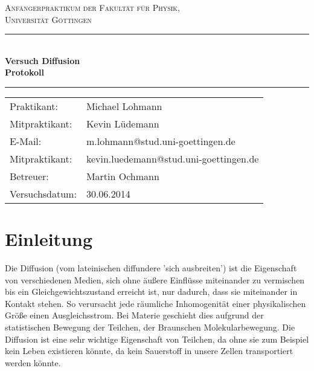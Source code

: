 \documentclass[12pt,a4paper,titlepage,headinclude,bibtotoc]{scrartcl}
\begin{document}
\begin{titlepage}
\centering
\textsc{\Large Anfängerpraktikum der Fakultät für
  Physik,\\[1.5ex] Universität Göttingen}

\vspace*{4.2cm}

\rule{\textwidth}{1pt}\\[0.5cm]
{\huge \bfseries
  Versuch Diffusion\\[1.5ex]
  Protokoll}\\[0.5cm]
\rule{\textwidth}{1pt}

\vspace*{3cm}

\begin{Large}
\begin{tabular}{ll}
Praktikant: &  Michael Lohmann\\
Mitpraktikant: &  Kevin Lüdemann\\
 E-Mail: & m.lohmann@stud.uni-goettingen.de\\
Mitpraktikant:  &  kevin.luedemann@stud.uni-goettingen.de\\
 Betreuer: & Martin Ochmann\\
 Versuchsdatum: & 30.06.2014\\
\end{tabular}
\end{Large}

\vspace*{0.8cm}

\begin{Large}
\end{Large}

\end{titlepage}

\tableofcontents

\newpage

\section{Einleitung}
\label{sec:einleitung}
Die Diffusion (vom lateinischen diffundere 'sich ausbreiten') ist die Eigenschaft von verschiedenen Medien, sich ohne äußere Einflüsse miteinander zu vermischen bis ein Gleichgewichtszustand erreicht ist, nur dadurch, dass sie miteinander in Kontakt stehen.
So verursacht jede räumliche Inhomogenität einer physikalischen Größe einen Ausgleichsstrom.
Bei Materie geschieht dies aufgrund der statistischen Bewegung der Teilchen, der Braunschen Molekularbewegung.
Die Diffusion ist eine sehr wichtige Eigenschaft von Teilchen, da ohne sie zum Beispiel kein Leben existieren könnte, da kein Sauerstoff in unsere Zellen transportiert werden könnte.
\end{document}
